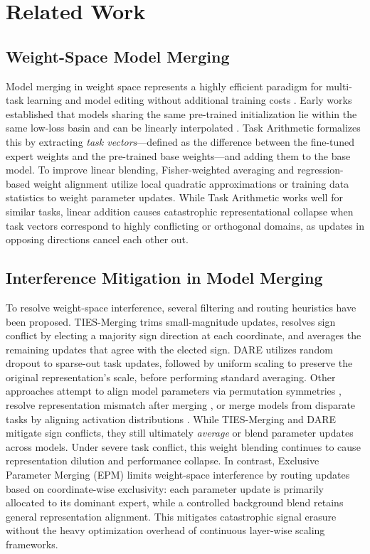 \section{Related Work}
\label{submission:related}

\subsection{Weight-Space Model Merging}
Model merging in weight space represents a highly efficient paradigm for multi-task learning and model editing without additional training costs \cite{wortsman2022model, mcmahan2017communication}. Early works established that models sharing the same pre-trained initialization lie within the same low-loss basin and can be linearly interpolated \cite{mirzadeh2020linear, gupta2020stochastic}. Task Arithmetic \cite{ilharco2023editing, chane2022patching} formalizes this by extracting \emph{task vectors}---defined as the difference between the fine-tuned expert weights and the pre-trained base weights---and adding them to the base model. To improve linear blending, Fisher-weighted averaging \cite{matena2022merging} and regression-based weight alignment \cite{jin2023regmean} utilize local quadratic approximations or training data statistics to weight parameter updates. While Task Arithmetic works well for similar tasks, linear addition causes catastrophic representational collapse when task vectors correspond to highly conflicting or orthogonal domains, as updates in opposing directions cancel each other out.

\subsection{Interference Mitigation in Model Merging}
To resolve weight-space interference, several filtering and routing heuristics have been proposed. TIES-Merging \cite{yadav2023ties} trims small-magnitude updates, resolves sign conflict by electing a majority sign direction at each coordinate, and averages the remaining updates that agree with the elected sign. DARE \cite{yu2024dare} utilizes random dropout to sparse-out task updates, followed by uniform scaling to preserve the original representation's scale, before performing standard averaging. Other approaches attempt to align model parameters via permutation symmetries \cite{ainsworth2022git}, resolve representation mismatch after merging \cite{jordan2022repair}, or merge models from disparate tasks by aligning activation distributions \cite{stoica2023zip}. 
While TIES-Merging and DARE mitigate sign conflicts, they still ultimately \emph{average} or blend parameter updates across models. Under severe task conflict, this weight blending continues to cause representation dilution and performance collapse. In contrast, Exclusive Parameter Merging (EPM) limits weight-space interference by routing updates based on coordinate-wise exclusivity: each parameter update is primarily allocated to its dominant expert, while a controlled background blend retains general representation alignment. This mitigates catastrophic signal erasure without the heavy optimization overhead of continuous layer-wise scaling frameworks.


